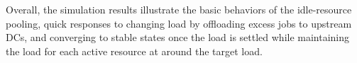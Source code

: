 Overall, the simulation results illustrate the basic behaviors of the
idle-resource pooling,
quick responses to changing
load by offloading excess jobs to upstream DCs,
and converging to stable states once the load is settled
while maintaining the load for each active resource at around the target
load.

